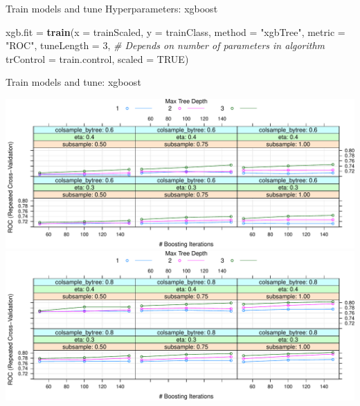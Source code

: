 \documentclass[ignorenonframetext,]{beamer}
\newenvironment{Shaded}{\begin{snugshade}}{\end{snugshade}}
\newcommand{\KeywordTok}[1]{\textcolor[rgb]{0.13,0.29,0.53}{\textbf{#1}}}
\newcommand{\DataTypeTok}[1]{\textcolor[rgb]{0.13,0.29,0.53}{#1}}
\newcommand{\DecValTok}[1]{\textcolor[rgb]{0.00,0.00,0.81}{#1}}
\newcommand{\StringTok}[1]{\textcolor[rgb]{0.31,0.60,0.02}{#1}}
\newcommand{\CommentTok}[1]{\textcolor[rgb]{0.56,0.35,0.01}{\textit{#1}}}
\newcommand{\OtherTok}[1]{\textcolor[rgb]{0.56,0.35,0.01}{#1}}
\newcommand{\NormalTok}[1]{#1}
\begin{document}
\begin{frame}[fragile]{Train models and tune Hyperparameters: xgboost}

\begin{Shaded}
\begin{Highlighting}[]
\NormalTok{xgb.fit =}\StringTok{ }\KeywordTok{train}\NormalTok{(}\DataTypeTok{x =}\NormalTok{ trainScaled, }\DataTypeTok{y =}\NormalTok{ trainClass,}
  \DataTypeTok{method =} \StringTok{"xgbTree"}\NormalTok{, }\DataTypeTok{metric =} \StringTok{"ROC"}\NormalTok{,}
  \DataTypeTok{tuneLength =} \DecValTok{3}\NormalTok{, }\CommentTok{# Depends on number of parameters in algorithm}
  \DataTypeTok{trControl =}\NormalTok{ train.control, }\DataTypeTok{scaled =} \OtherTok{TRUE}\NormalTok{)}
\end{Highlighting}
\end{Shaded}

\end{frame}

\begin{frame}{Train models and tune: xgboost}

\includegraphics{ML_with_caret_files/figure-beamer/plot_train_xgb-1.pdf}
\includegraphics{ML_with_caret_files/figure-beamer/plot_train_xgb-2.pdf}

\end{frame}
\end{document}
